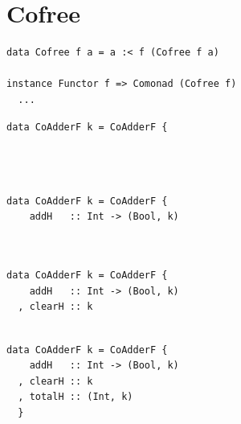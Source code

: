 \documentclass{beamer}
\begin{document}
\section{Cofree}

\begin{frame}[fragile]
  \begin{verbatim}
data Cofree f a = a :< f (Cofree f a)

instance Functor f => Comonad (Cofree f)
  ...
  \end{verbatim}
\end{frame}

\begin{frame}[fragile]
  \begin{overprint}
  \begin{verbatim}
data CoAdderF k = CoAdderF {




  \end{verbatim}
  \begin{verbatim}
data CoAdderF k = CoAdderF {
    addH   :: Int -> (Bool, k)



  \end{verbatim}
  \begin{verbatim}
data CoAdderF k = CoAdderF {
    addH   :: Int -> (Bool, k)
  , clearH :: k


  \end{verbatim}
  \begin{verbatim}
data CoAdderF k = CoAdderF {
    addH   :: Int -> (Bool, k)
  , clearH :: k
  , totalH :: (Int, k)
  }
  \end{verbatim}
  \end{overprint}
\end{frame}
\end{document}
